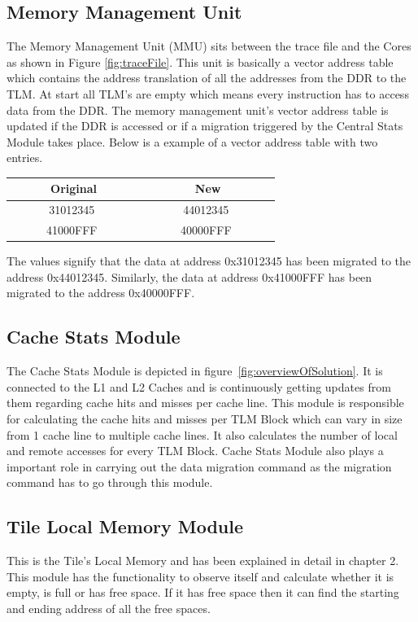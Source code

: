 \documentclass{listhesis}
\begin{document}
\subsection{Memory Management Unit}
The Memory Management Unit (MMU) sits between the trace file and the Cores as shown in Figure \ref{fig:traceFile}. This unit is basically a vector address table which contains the address translation of all the addresses from the DDR to the TLM. At start all TLM's are empty which means every instruction has to access data from the DDR. The memory management unit's vector address table is updated if the DDR is accessed or if a migration triggered by the Central Stats Module takes place.
Below is a example of a vector address table with two entries.\\
\begin{center}
 \begin{tabular}{c | c } 
 \hline
 \textbf{Original} &  \textbf{New}  \\
 \hline
 \rule{0pt}{4ex}     \ \ \ \ \ \ 31012345 \ \ \ \ \ \ &   \ \ \ \ \ \ 44012345 \ \ \ \ \ \ \\ 
  \ \ \ \ \ \ 41000FFF \ \  \ \ \ \ &  \ \ \ \ \ \ 40000FFF \ \ \ \ \ \ \\ 
\end{tabular}
\end{center}
The values signify that the data at address 0x31012345 has been migrated to the address 0x44012345. Similarly, the data at address 0x41000FFF has been migrated to the address 0x40000FFF.
\subsection{Cache Stats Module}
The Cache Stats Module is depicted in figure~\ref{fig:overviewOfSolution}. It is connected to the L1 and L2 Caches and is continuously getting updates from them regarding cache hits and misses per cache line. This module is responsible for calculating the cache hits and misses per TLM Block which can vary in size from 1 cache line to multiple cache lines. It also calculates the number of local and remote accesses for every TLM Block. Cache Stats Module also plays a important role in carrying out the data migration command as the migration command has to go through this module. 
\subsection{Tile Local Memory Module}
This is the Tile's Local Memory and has been explained in detail in chapter 2. This module has the functionality to observe itself and calculate whether it is empty, is full or has free space. If it has free space then it can find the starting and ending address of all the free spaces. 
\end{document}
